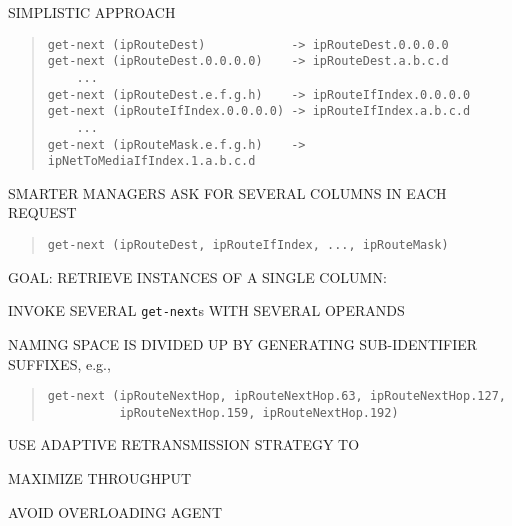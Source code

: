 \begin{bwslide}

\begin{nrtc}
\item	SIMPLISTIC APPROACH
\begin{quote}\small\begin{verbatim}
get-next (ipRouteDest)            -> ipRouteDest.0.0.0.0
get-next (ipRouteDest.0.0.0.0)    -> ipRouteDest.a.b.c.d
    ...
get-next (ipRouteDest.e.f.g.h)    -> ipRouteIfIndex.0.0.0.0
get-next (ipRouteIfIndex.0.0.0.0) -> ipRouteIfIndex.a.b.c.d
    ...
get-next (ipRouteMask.e.f.g.h)    -> ipNetToMediaIfIndex.1.a.b.c.d
\end{verbatim}\end{quote}

\item	SMARTER MANAGERS ASK FOR SEVERAL COLUMNS IN EACH REQUEST
\begin{quote}\small\begin{verbatim}
get-next (ipRouteDest, ipRouteIfIndex, ..., ipRouteMask)
\end{verbatim}\end{quote}
\end{nrtc}
\end{bwslide}


\begin{bwslide}

\begin{nrtc}
\item	GOAL: RETRIEVE INSTANCES OF A SINGLE COLUMN:

\item	INVOKE SEVERAL \verb"get-next"s WITH SEVERAL OPERANDS

\item	NAMING SPACE IS DIVIDED UP BY GENERATING SUB-IDENTIFIER SUFFIXES,
	e.g.,
\begin{quote}\small\begin{verbatim}
get-next (ipRouteNextHop, ipRouteNextHop.63, ipRouteNextHop.127,
          ipRouteNextHop.159, ipRouteNextHop.192)
\end{verbatim}\end{quote}

\item	USE ADAPTIVE RETRANSMISSION STRATEGY TO
    \begin{nrtc}
    \item	MAXIMIZE THROUGHPUT

    \item	AVOID OVERLOADING AGENT
    \end{nrtc}
\end{nrtc}
\end{bwslide}


